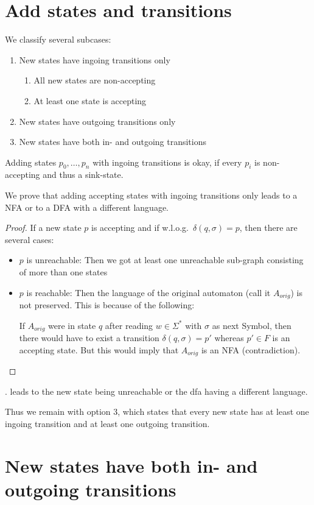 \documentclass[a4paper, oneside, 11pt]{report}
\theoremstyle{definition}
\theoremstyle{remark}
\begin{document}
\section{Add states and transitions}

We classify several subcases:

\begin{enumerate}
	\item New states have ingoing transitions only
	\begin{enumerate}
		\item All new states are non-accepting
		\item At least one state is accepting
	\end{enumerate}
	\item New states have outgoing transitions only
	\item New states have both in- and outgoing transitions
\end{enumerate}
Adding states $p_0, \ldots, p_n$ with ingoing transitions is okay, if every $p_i$ is non-accepting and thus a sink-state.

We prove that adding accepting states with ingoing transitions only leads to a NFA or to a DFA with a different language.
\begin{proof}
	If a new state $p$ is accepting and if w.l.o.g.\ $\delta(q, \sigma) = p$, then there are several cases:
	\begin{itemize}
		\item $p$ is unreachable: Then we got at least one unreachable sub-graph consisting of more than one states
		\item $p$ is reachable: Then the language of the original automaton (call it $A_{orig}$) is not preserved. This is because of the following:
		
		If $A_{orig}$ were in state $q$ after reading $w \in \Sigma^*$ with $\sigma$ as next Symbol, then there would have to exist a transition $\delta(q, \sigma) = p'$ whereas $p' \in F$ is an accepting state. But this would imply that $A_{orig}$ is an NFA (contradiction).
	\end{itemize}
\end{proof}

. leads to the new state being unreachable or the dfa having a different language.

Thus we remain with option 3, which states that every new state has at least one ingoing transition and at least one outgoing transition.

\section{New states have both in- and outgoing transitions}
\end{document}
